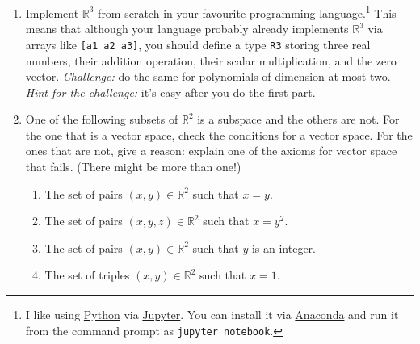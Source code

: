 \documentclass[a4paper,11pt]{article}
\theoremstyle{definition}
\begin{document}
\begin{enumerate}[(1)]
\item
Implement $\mathbb R^3$ from scratch in your favourite programming language.\footnote{I like using \href{https://www.python.org/}{Python} via \href{https://jupyter.org/}{Jupyter}.
You can install it via \href{https://www.anaconda.com/}{Anaconda} and run it from the command prompt as \texttt{jupyter notebook}.}
This means that although your language probably already implements $\mathbb R^3$ via arrays like \texttt{[a1 a2 a3]}, you should define a type \texttt{R3} storing three real numbers, their addition operation, their scalar multiplication, and the zero vector.
\textit{Challenge:}
do the same for polynomials of dimension at most two. 
\textit{Hint for the challenge:}
it's easy after you do the first part.
\item
One of the following subsets of $\mathbb R^2$ is a subspace and the others are not.
For the one that is a vector space, check the conditions for a vector space.
For the ones that are not, give a reason: explain one of the axioms for vector space that fails. (There might
be more than one!)
\begin{enumerate}
    \item
    The set of pairs $(x,y)\in \mathbb R^2$ such that $x=y$.
    \item 
    The set of pairs $(x,y,z)\in\mathbb R^2$ such that $x=y^2$.
    \item
    The set of pairs $(x,y)\in\mathbb R^2$ such that $y$ is an integer.
    \item 
    The set of triples $(x,y)\in\mathbb R^2$ such that $x=1$.
\end{enumerate}


\end{enumerate}
\end{document}
